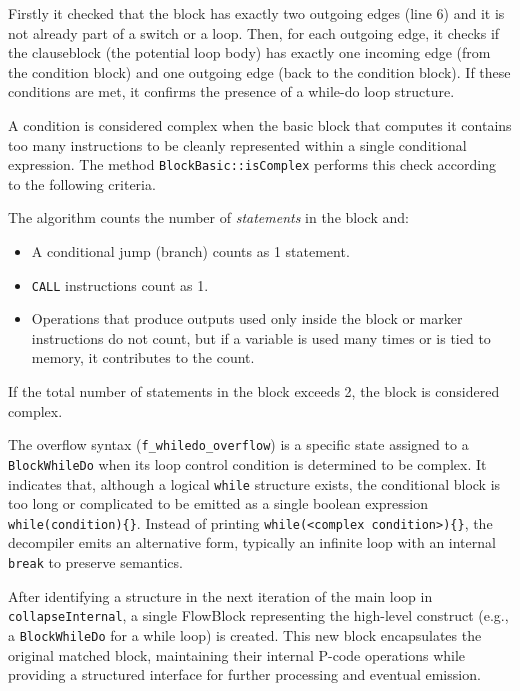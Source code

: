 Firstly it checked that the block has exactly two outgoing edges (line 6) and it is not already part of a switch or a loop. 
Then, for each outgoing edge, it checks if the clauseblock (the potential loop body) has exactly one incoming edge 
(from the condition block) and one outgoing edge (back to the condition block). 
If these conditions are met, it confirms the presence of a while-do loop structure.

A condition is considered complex when the basic block that computes it contains too many instructions to be cleanly represented within a single conditional expression.
The method \texttt{BlockBasic::isComplex} performs this check according to the following criteria.

The algorithm counts the number of \emph{statements} in the block and:
\begin{itemize}
    \item A conditional jump (branch) counts as 1 statement.
    \item \texttt{CALL} instructions count as 1.
    \item Operations that produce outputs used only inside the block or marker instructions do not count, 
    but if a variable is used many times or is tied to memory, it contributes to the count.
\end{itemize}
If the total number of statements in the block exceeds 2, the block is considered complex.

The overflow syntax (\texttt{f\_whiledo\_overflow}) is a specific state assigned to a \texttt{BlockWhileDo} when its loop control condition is determined to be complex.
It indicates that, although a logical \texttt{while} structure exists, the conditional block is too long or complicated to be emitted as a single boolean expression \texttt{while(condition)\{\}}.
Instead of printing \texttt{while(<complex condition>)\{\}}, the decompiler emits an alternative form, typically an infinite loop with an internal \texttt{break} to preserve semantics.

After identifying a structure in the next iteration of the main loop in \texttt{collapseInternal}, a single FlowBlock representing the high-level construct (e.g., a \texttt{BlockWhileDo} for a while loop) is created. 
This new block encapsulates the original matched block, maintaining their internal P-code operations while providing a structured interface for further processing and eventual emission.

